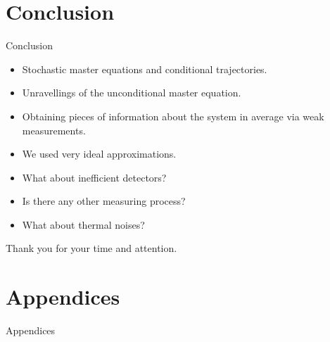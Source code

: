 \documentclass[10pt,xcolor=table]{beamer}
\theoremstyle{definition}
\newcommand{\backupbegin}{
	\newcounter{finalframe}
	\setcounter{finalframe}{\value{framenumber}}
}
\begin{document}
\section{Conclusion}
\begin{frame}{Conclusion}
	\begin{itemize}[label=$\blacktriangleright$]
		\item Stochastic master equations and conditional trajectories.
		\item Unravellings of the unconditional master equation.
		\item Obtaining pieces of information about the system in average via weak measurements.
	\end{itemize}\pause\vfill
	\begin{itemize}[label=$\bullet$]
		\item We used very ideal approximations.
		\item What about inefficient detectors?
		\item Is there any other measuring process?
		\item What about thermal noises?
	\end{itemize}\pause
	\vfill\centering\Large
	Thank you for your time and attention.
\end{frame}

\appendix\backupbegin{}
\section*{Appendices}
\begin{frame}
	\vfill
	\centering\Huge
	Appendices
	\vfill
\end{frame}
\end{document}
